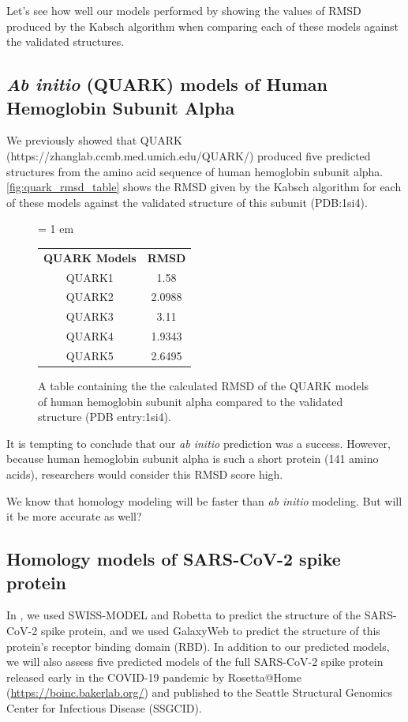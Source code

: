 {{Let's see how well our models performed by showing the values of RMSD produced by the Kabsch algorithm when comparing each of these models against the validated structures.

\FloatBarrier
{}
\subsection{\textit{Ab initio} (QUARK) models of Human Hemoglobin Subunit Alpha}

We previously showed that QUARK (https://zhanglab.ccmb.med.umich.edu/QUARK/) produced five predicted structures from the amino acid sequence of human hemoglobin subunit alpha. \autoref{fig:quark_rmsd_table} shows the RMSD given by the Kabsch algorithm for each of these models against the validated structure of this subunit (PDB:1si4).

\begin{figure}[h]
\centering
\tabcolsep = 1 em
\mySfFamily
\begin{tabular}{c c}
\textbf{QUARK Models} & \textbf{RMSD} \\
QUARK1 & 1.58 \\
QUARK2 & 2.0988 \\
QUARK3 & 3.11 \\
QUARK4 & 1.9343 \\
QUARK5 & 2.6495 \\
\end{tabular}
\caption{A table containing the the calculated RMSD of the QUARK models of human hemoglobin subunit alpha compared to the validated structure (PDB entry:1si4).}
\label{fig:quark_rmsd_table}
\end{figure}

It is tempting to conclude that our \textit{ab initio} prediction was a success. However, because human hemoglobin subunit alpha is such a short protein (141 amino acids), researchers would consider this RMSD score high.

We know that homology modeling will be faster than \textit{ab initio} modeling. But will it be more accurate as well?

\FloatBarrier
{}
\subsection{Homology models of SARS-CoV-2 spike protein}

In , we used SWISS-MODEL and Robetta to predict the structure of the SARS-CoV-2 spike protein, and we used GalaxyWeb to predict the structure of this protein's receptor binding domain (RBD). In addition to our predicted models, we will also assess five predicted models of the full SARS-CoV-2 spike protein released early in the COVID-19 pandemic by Rosetta@Home (\url{https://boinc.bakerlab.org/}) and published to the Seattle Structural Genomics Center for Infectious Disease (SSGCID).

}}
